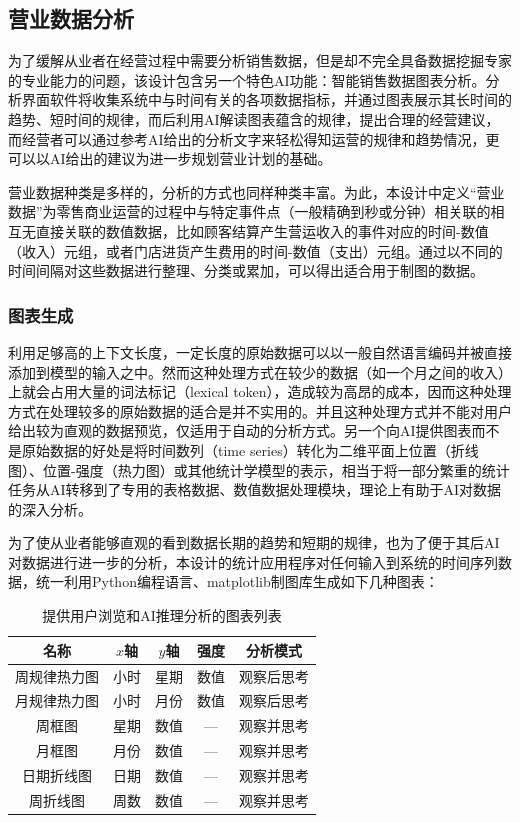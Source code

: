 \subsection{营业数据分析}

为了缓解从业者在经营过程中需要分析销售数据，但是却不完全具备数据挖掘专家的专业能力的问题，该设计包含另一个特色AI功能：智能销售数据图表分析。分析界面软件将收集系统中与时间有关的各项数据指标，并通过图表展示其长时间的趋势、短时间的规律，而后利用AI解读图表蕴含的规律，提出合理的经营建议，而经营者可以通过参考AI给出的分析文字来轻松得知运营的规律和趋势情况，更可以以AI给出的建议为进一步规划营业计划的基础。

营业数据种类是多样的，分析的方式也同样种类丰富。为此，本设计中定义“营业数据”为零售商业运营的过程中与特定事件点（一般精确到秒或分钟）相关联的相互无直接关联的数值数据，比如顾客结算产生营运收入的事件对应的时间-数值（收入）元组，或者门店进货产生费用的时间-数值（支出）元组。通过以不同的时间间隔对这些数据进行整理、分类或累加，可以得出适合用于制图的数据。

\subsubsection{图表生成}

利用足够高的上下文长度，一定长度的原始数据可以以一般自然语言编码并被直接添加到模型的输入之中。然而这种处理方式在较少的数据（如一个月之间的收入）上就会占用大量的词法标记（lexical token），造成较为高昂的成本，因而这种处理方式在处理较多的原始数据的适合是并不实用的。并且这种处理方式并不能对用户给出较为直观的数据预览，仅适用于自动的分析方式。另一个向AI提供图表而不是原始数据的好处是将时间数列（time series）转化为二维平面上位置（折线图）、位置-强度（热力图）或其他统计学模型的表示，相当于将一部分繁重的统计任务从AI转移到了专用的表格数据、数值数据处理模块，理论上有助于AI对数据的深入分析。

为了使从业者能够直观的看到数据长期的趋势和短期的规律，也为了便于其后AI对数据进行进一步的分析，本设计的统计应用程序对任何输入到系统的时间序列数据，统一利用Python编程语言、matplotlib制图库生成如下几种图表：

\begin{table}[htbp]
    \centering
    \begin{tabular}{|c|c|c|c|c|}
        \hline
        名称 & $x$轴 & $y$轴 & 强度 & 分析模式\\
        \hline
        周规律热力图 & 小时 & 星期 & 数值 & 观察后思考 \\
        \hline
        月规律热力图 & 小时 & 月份 & 数值 & 观察后思考 \\
        \hline
        周框图 & 星期 & 数值 & --- & 观察并思考 \\
        \hline
        月框图 & 月份 & 数值 & --- & 观察并思考 \\
        \hline
        日期折线图 & 日期 & 数值 & --- & 观察并思考 \\
        \hline
        周折线图 & 周数 & 数值 & --- & 观察并思考 \\
        \hline
    \end{tabular}
    \caption{提供用户浏览和AI推理分析的图表列表}
	\label{tab:graphs}
\end{table}

